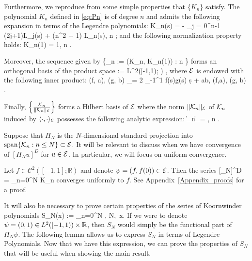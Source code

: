 Furthermore, we reproduce from \cite[Prop.~3.1]{CGLW16} some simple properties that \(\{K_n\}\) satisfy.
\bprop
The polynomial \(K_n\) defined in \eqref{eq:Pn} is of degree \(n\) and  admits the following expansion in terms of the Legendre polynomials:
\be\label{eq:Pn2}
    K_n(s) = - \sum_{j = 0}^{n-1} (2j+1)L_j(s) + (n^2 + 1) L_n(s), \qquad n \in \Nzero;
\ee
and the following normalization property holds:
\be
    K_n(1) = 1, \qquad n \in \Nzero.
\ee

Moreover, the sequence given by
\be
    \{_n := (K_n, K_n(1)) : n \in \Nzero\}
\ee 
forms an orthogonal basis of the  product space 
\be
     := L^2([-1,1); \R) \times  \R,
\ee 
where \(\mathcal E\) is endowed with the following inner product:
\be
    \langle (f, a), (g, b) \rangle_\mcE =  2 \int_{-1}^1 f(s)g(s) \d s  + ab, \quad (f,a), (g, b) \in \mcE.
\ee

Finally, \(\left\{ \frac{\mathcal K_n}{\| \mathcal K_n \|_\mathcal E} \right\}\) forms a Hilbert basis of $\mathcal E$ where 
the norm \(\| \mathcal K_n \|_\mathcal E\) of \(\mathcal K_n\) induced by  \(\langle \cdot, \cdot \rangle_\mathcal E\)  possesses the following analytic expression:
\be \label{eq:Pn_norm}
    \|\mcK_n\|_\mcE = , \qquad n \in \Nzero.
\ee
\eprop

Suppose that \(\Pi_N\) is the \(N\)-dimensional standard projection into \(\mbox{span}\{\mathcal K_n: n\leq N\} \subset \mathcal E\). It will be relevant to discuss when we have convergence of \([\Pi_N u]^D\) for \(u\in\mathcal E\). In particular, we will focus on uniform convergence. 

\bprop\label{prop:uniform-conv}
Let \(f\in \mathcal C^2([-1,1];\mathbb R)\) and denote \(\psi = (f, f(0)) \in\mathcal E\). Then the series
\be\label{koorn-series}
    [\Pi_N\psi]^D = \sum_{n=0}^N  K_n
\ee
converges uniformly to \(f\).
\eprop
See Appendix~\ref{Appendix_proofs} for a proof.

It will also be necessary to prove certain properties of the series of Koornwinder polynomials
\be\label{eq:SN}
    S_N(x) := \sum_{n=0}^N , \quad N\in\Nzero,\  x\in[-1,1].
\ee
If we were to denote \(\psi = (0,1) \in L^2([-1,1)) \times \mathbb R\), then \(S_N\) would simply be the functional part of \(\Pi_N\psi\). The following lemma allows us to express \(S_N\) in terms of Legendre Polynomials. Now that we have this expression, we can prove the properties of \(S_N\) that will be useful when showing the main result.

